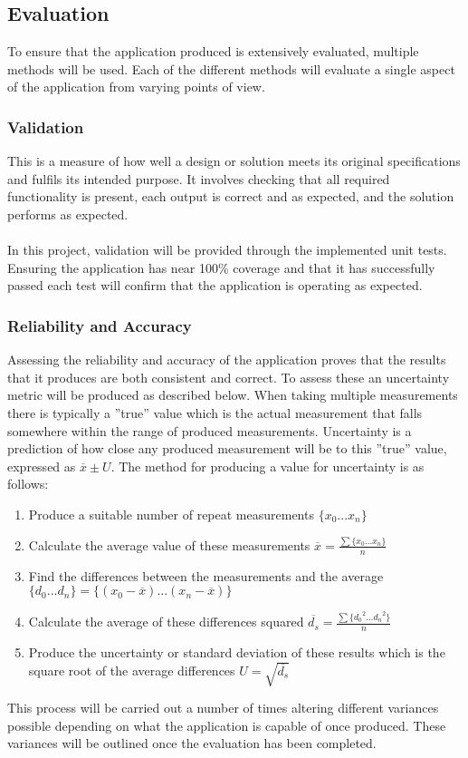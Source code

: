 	\subsection{Evaluation}
		To ensure that the application produced is extensively evaluated, multiple methods will be used. Each of the different methods will evaluate a single aspect of the application from varying points of view.
		\subsubsection{Validation}
			This is a measure of how well a design or solution meets its original specifications and fulfils its intended purpose. It involves checking that all required functionality is present, each output is correct and as expected, and the solution performs as expected.
			\\\\
			In this project, validation will be provided through the implemented unit tests. Ensuring the application has near 100\% coverage and that it has successfully passed each test will confirm that the application is operating as expected.
		\subsubsection{Reliability and Accuracy}
			Assessing the reliability and accuracy of the application proves that the results that it produces are both consistent and correct. To assess these an uncertainty metric will be produced as described below. When taking multiple measurements there is typically a ”true” value which is the actual measurement that falls somewhere within the range of produced measurements. Uncertainty is a prediction of how close any produced measurement will be to this ”true” value, expressed as $\overline{x} \pm U$. The method for producing a value for uncertainty is as follows:
			\begin{enumerate}
				\item Produce a suitable number of repeat measurements $\{x_0 ... x_n\}$
				\item Calculate the average value of these measurements $\overline{x}=\frac{\sum\{x_0...x_n\}}{n}$
				\item Find the differences between the measurements and the average $\{d_0...d_n\} = \{(x_0-\overline{x})...(x_n-\overline{x})\}$
				\item Calculate the average of these differences squared $\overline{d_s} = \frac{\sum\{{d_0}^2...{d_n}^2\}}{n}$
				\item Produce the uncertainty or standard deviation of these results which is the square root of the average differences $U= \sqrt{\overline{d_s}}$
			\end{enumerate}
			This process will be carried out a number of times altering  different variances possible depending on what the application is capable of once produced. These variances will be outlined once the evaluation has been completed.
